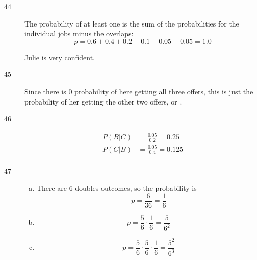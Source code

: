 \documentclass[letterpaper, landscape]{exam}
\begin{document}
\begin{description}



    \item[44]
      The probability of at least one is the sum of the probabilities for the individual
      jobs minus the overlaps:
        \[
          p = 0.6 + 0.4 + 0.2 - 0.1 - 0.05 - 0.05 = \boxed{ 1.0 }
        \]

        Julie is very confident.

    \item[45]
      Since there is 0 probability of here getting all three offers, this is just the
      probability of her getting the other two offers, or .

    \item[46]
      \begin{align*}
        P(B|C) &= \frac{0.05}{0.2} = \boxed{ 0.25 } \\
        P(C|B) &= \frac{0.05}{0.4} = \boxed{ 0.125 } \\
      \end{align*}

    \item[47]
      \begin{enumerate}[(a)]
        \item There are 6 doubles outcomes, so the probability is
          \[
            p = \frac{6}{36} = \boxed{ \frac{1}{6} }
          \]

        \item 
          \[
            p = \frac{5}{6} \cdot \frac{1}{6} = \boxed{ \frac{5}{6^2} }
          \]

        \item 
          \[
            p = \frac{5}{6} \cdot \frac{5}{6} \cdot \frac{1}{6} 
              = \boxed{ \frac{5^2}{6^3} }
          \]


\end{enumerate}
\end{description}
\end{document}
